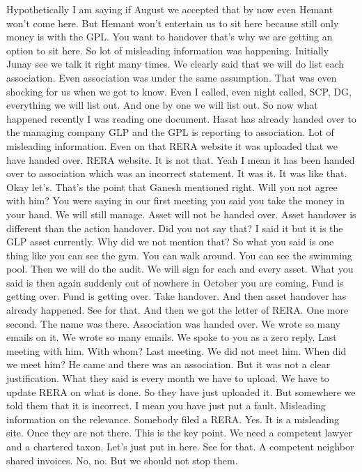 Hypothetically I am saying if August we accepted that by now even Hemant won't come here.
But Hemant won't entertain us to sit here because still only money is with the GPL.
You want to handover that's why we are getting an option to sit here.
So lot of misleading information was happening.
Initially Junay see we talk it right many times.
We clearly said that we will do list each association.
Even association was under the same assumption. That was even shocking for us when we got to know.
Even I called, even night called, SCP, DG, everything we will list out.
And one by one we will list out.
So now what happened recently I was reading one document.
Hasat has already handed over to the managing company GLP and the GPL is reporting to association.
Lot of misleading information.
Even on that RERA website it was uploaded that we have handed over.
RERA website.
It is not that.
Yeah I mean it has been handed over to association which was an incorrect statement.
It was it.
It was like that.
Okay let's.
That's the point that Ganesh mentioned right.
Will you not agree with him?
You were saying in our first meeting you said you take the money in your hand.
We will still manage.
Asset will not be handed over. Asset handover is different than the action handover.
Did you not say that?
I said it but it is the GLP asset currently.
Why did we not mention that?
So what you said is one thing like you can see the gym.
You can walk around. You can see the swimming pool.
Then we will do the audit.
We will sign for each and every asset.
What you said is then again suddenly out of nowhere in October you are coming.
Fund is getting over. Fund is getting over. Take handover.
And then asset handover has already happened.
See for that.
And then we got the letter of RERA.
One more second.
The name was there.
Association was handed over.
We wrote so many emails on it.
We wrote so many emails. We spoke to you as a zero reply.
Last meeting with him.
With whom?
Last meeting.
We did not meet him.
When did we meet him?
He came and there was an association.
But it was not a clear justification.
What they said is every month we have to upload.
We have to update RERA on what is done.
So they have just uploaded it.
But somewhere we told them that it is incorrect.
I mean you have just put a fault.
Misleading information on the relevance.
Somebody filed a RERA.
Yes. It is a misleading site.
Once they are not there.
This is the key point.
We need a competent lawyer and a chartered taxon.
Let's just put in here.
See for that.
A competent neighbor shared invoices.
No, no. But we should not stop them.
